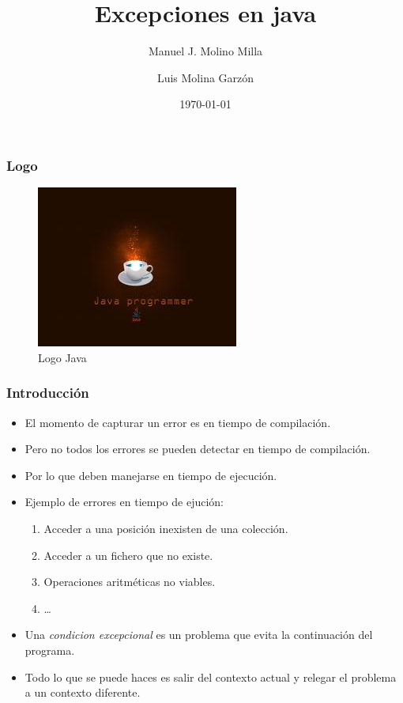 \documentclass{beamer}
\title{Excepciones en java}
\author{Manuel J. Molino Milla \and Luis Molina Garzón}
\date{\today} %
\institute{IES Virgen del Carmen \and Departamento de Informática}
\begin{document}
\begin{frame}
  \titlepage
\end{frame}

\begin{frame}
    \frametitle{Logo}
\begin{figure}
\includegraphics[scale=1]{imagenes/logo.jpeg} 
\caption{Logo Java}
\end{figure}
\end{frame}





\begin{frame}[fragile]
\frametitle{Introducción}
\begin{itemize}[<+->]
\item El momento de capturar un error es en tiempo de compilación.
\item Pero no todos los errores se pueden detectar en tiempo de compilación.
\item Por lo que deben manejarse en tiempo de ejecución.
\item Ejemplo de errores en tiempo de ejución:
\begin{enumerate}
\item Acceder a una posición inexisten de una colección.
\item Acceder a un fichero que no existe.
\item Operaciones aritméticas no viables.
\item \dots
\end{enumerate}
\item Una \emph{condicion excepcional} es un problema que evita la continuación del programa.
\item Todo lo que se puede haces es salir del contexto actual y relegar el problema a un contexto diferente.
\end{itemize}
\end{frame}
\end{document}
